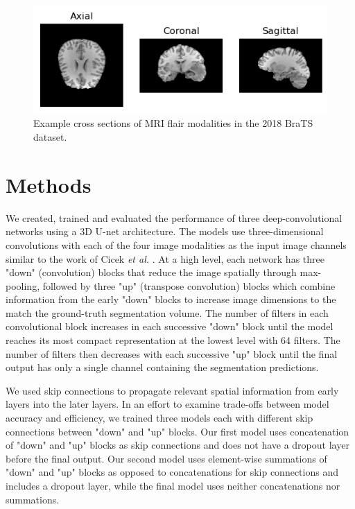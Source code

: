 \documentclass{article}
\newcommand\tab[1][0.5cm]{\hspace*{#1}}
\begin{document}
\begin{figure}[!ht]
\centering
\includegraphics[scale=0.9]{brain_example}
\caption{Example cross sections of MRI flair modalities in the 2018 BraTS dataset.}
\end{figure}

\section{Methods}
\tab We created, trained and evaluated the performance of three deep-convolutional networks using a 3D U-net architecture. The models use three-dimensional convolutions with each of the four image modalities as the input image channels similar to the work of Cicek \textit{et al.} \cite{DBLP:journals/corr/CicekALBR16}. At a high level, each network has three "down" (convolution) blocks that reduce the image spatially through max-pooling, followed by three "up" (transpose convolution) blocks which combine information from the early "down" blocks to increase image dimensions to the match the ground-truth segmentation volume. The number of filters in each convolutional block increases in each successive "down" block until the model reaches its most compact representation at the lowest level with 64 filters. The number of filters then decreases with each successive "up" block until the final output has only a single channel containing the segmentation predictions.

We used skip connections to propagate relevant spatial information from early layers into the later layers. In an effort to examine trade-offs between model accuracy and efficiency, we trained three models each with different skip connections between "down" and "up" blocks. Our first model uses concatenation of "down" and "up" blocks as skip connections and does not have a dropout layer before the final output. Our second model uses element-wise summations of "down" and "up" blocks as opposed to concatenations for skip connections and includes a dropout layer, while the final model uses neither concatenations nor summations.
\end{document}
